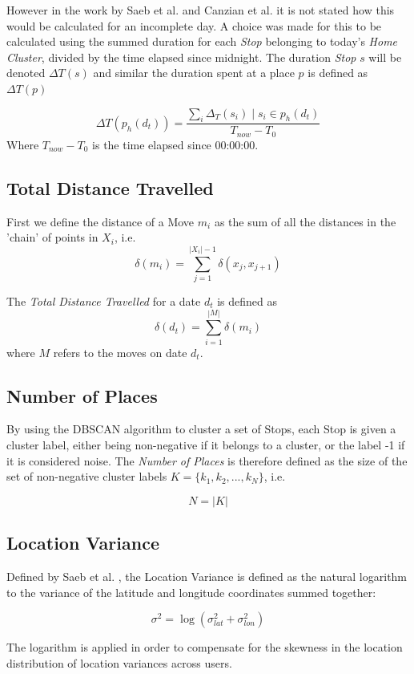 However in the work by Saeb et al. \cite{Saeb2015} and Canzian et al.\cite{Canzian2015} it is not stated how this would be calculated for an incomplete day. A choice was made for this to be calculated using the summed duration for each \textit{Stop} belonging to today's \textit{Home Cluster}, divided by the time elapsed since midnight. The duration \textit{Stop} $s$ will be denoted $\Delta T (s)$ and similar the duration spent at a place $p$ is defined as $\Delta T (p)$

$$\Delta T(p_{h} (d_t) )= \frac{\sum_i \Delta_T (s_i) \;|\; s_i \in p_h (d_t)}{T_{now} - T_{0}}$$
Where $T_{now} - T_0$ is the time elapsed since 00:00:00.

\subsection{Total Distance Travelled}
First we define the distance of a Move $m_i$ as the sum of all the distances in the 'chain' of points in $X_i$, i.e.
$$\delta (m_i)  = \sum_{j=1}^{|X_i|-1} \delta (x_j, x_{j+1})$$

The \textit{Total Distance Travelled} for a date $d_t$ is defined as $$\delta (d_t) = \sum_{i=1}^{|M|} \delta (m_i) $$ where $M$ refers to the moves on date $d_t$.

\subsection{Number of Places}
By using the DBSCAN algorithm to cluster a set of Stops, each Stop is given a cluster label, either being non-negative if it belongs to a cluster, or the label -1 if it is considered noise. The \textit{Number of Places} is therefore defined as the size of the set of non-negative cluster labels $K = \{k_1, k_2, ..., k_N\}$, i.e.

$$N = |K|$$

\subsection{Location Variance}
Defined by Saeb et al. \cite{Saeb2015}, the Location Variance is defined as the natural logarithm to the variance of the latitude and longitude coordinates summed together: 

$$\sigma^2 = \log (\sigma_{lat}^2 + \sigma_{lon}^2)$$

The logarithm is applied in order to compensate for the skewness in the location distribution of location variances across users.

